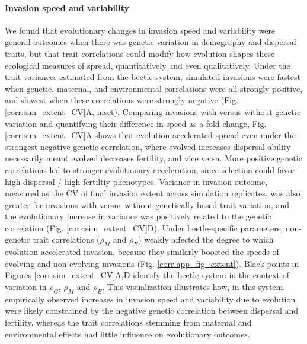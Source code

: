 \documentclass[11pt]{article}
\newcommand{\revise}[1]{{\color{Mahogany}{#1}}}
\begin{document}
\paragraph{Invasion speed and variability}
We found that evolutionary changes in invasion speed and variability were general outcomes when there was genetic variation in demography and dispersal traits, but that trait correlations could modify how evolution shapes these ecological measures of spread, quantitatively and even qualitatively.
Under the trait variances estimated from the beetle system, simulated invasions were fastest when genetic, maternal, and environmental correlations were all strongly positive, and slowest when these correlations were strongly negative (Fig. \ref{corr:sim_extent_CV}A, inset).
Comparing invasions with versus without genetic variation and quantifying their difference in speed as a fold-change, Fig. \ref{corr:sim_extent_CV}A shows that evolution accelerated spread even under the strongest negative genetic correlation, where evolved increases \revise{in} dispersal ability necessarily meant evolved decreases \revise{in} fertility, and vice versa.
More positive genetic correlations led to stronger evolutionary acceleration, since selection could favor high-dispersal / high-fertiltiy phenotypes.
Variance in invasion outcome, measured as the CV of final invasion extent across simulation replicates, was also greater for invasions with versus without genetically based trait variation, and the evolutionary increase in variance was positively related to the genetic correlation (Fig. \ref{corr:sim_extent_CV}D).
Under beetle-specific parameters, non-genetic trait correlations ($\rho_{M}$ and $\rho_{E}$) weakly affected the degree to which evolution accelerated invasion, because they similarly boosted the speeds of evolving and non-evolving invasions (Fig. \ref{corr:app_fig_extent}). 
Black points in Figures \ref{corr:sim_extent_CV}A,D identify the beetle system in the context of variation in $\rho_{G}$, $\rho_{M}$ and $\rho_{E}$.
This visualization illustrates how, in this system, empirically observed increases in invasion speed and variability due to evolution were likely constrained by the negative genetic correlation between dispersal and fertility, whereas the trait correlations stemming from maternal and environmental effects had little influence on evolutionary outcomes.
\end{document}
